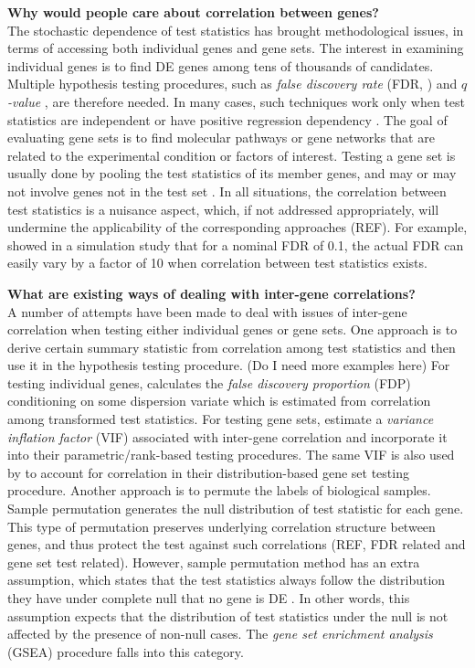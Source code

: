 \documentclass[12pt, a4paper]{article}
\begin{document}
	\textbf{Why would people care about correlation between genes?}\\
	 The stochastic dependence of test statistics has brought methodological issues, in terms of accessing both individual genes and gene sets. The interest in examining individual genes is to find DE genes among tens of thousands of candidates. Multiple hypothesis testing procedures, such as \textit{false discovery rate} (FDR, \citealt{benjamini1995controlling}) and \textit{$q$-value} \citep{storey2003positive}, are therefore needed. In many cases, such techniques work only when test statistics are independent \citep{benjamini1995controlling} or have positive regression dependency \citep{benjamini2001control}. The goal of evaluating gene sets is to find molecular pathways or gene networks that are related to the experimental condition or factors of interest. Testing a gene set is usually done by pooling the test statistics of its member genes, and may or may not involve genes not in the test set \citep{goeman2007analyzing}. In all situations, the correlation between test statistics is a nuisance aspect, which, if not addressed appropriately, will undermine the applicability of the corresponding approaches (REF). For
	 example, \citet{efron2007correlation} showed in a simulation study that for a nominal FDR of 0.1, the
	 actual FDR can easily vary by a factor of 10 when correlation between test statistics exists. 
	 
	 \textbf{What are existing ways of dealing with inter-gene correlations?}\\
	 A number of attempts have been made to deal with issues of inter-gene correlation when testing either individual genes or gene sets. One approach is to derive certain summary statistic from correlation among test statistics and then use it in the hypothesis testing procedure. (Do I need more examples here) For testing individual genes, \citet{efron2007correlation} calculates the \textit{false discovery proportion} (FDP) conditioning on some dispersion variate which is estimated from correlation among transformed test statistics.  For testing gene sets, \citet{wu2012camera} estimate a \textit{variance inflation factor} (VIF) associated with inter-gene correlation and incorporate it into their parametric/rank-based testing procedures. The same VIF is also used by \citet{yaari2013quantitative} to account for correlation in their distribution-based gene set testing procedure. Another approach is to permute the labels of biological samples. Sample permutation generates the null distribution of test statistic for each gene.
	 This type of permutation preserves underlying correlation structure between genes, and thus protect the test against such correlations (REF, FDR related and gene set test related). However, sample permutation method has an extra assumption, which states that the test statistics always follow the distribution they have under complete null  that no gene is DE \cite{efron2012large1}. In other words, this assumption expects that the distribution of test statistics under the null is not affected by the presence of non-null cases. The \textit{gene set enrichment analysis} (GSEA) procedure \citep{subramanian2005gene} falls into this category.
	 
\end{document}

